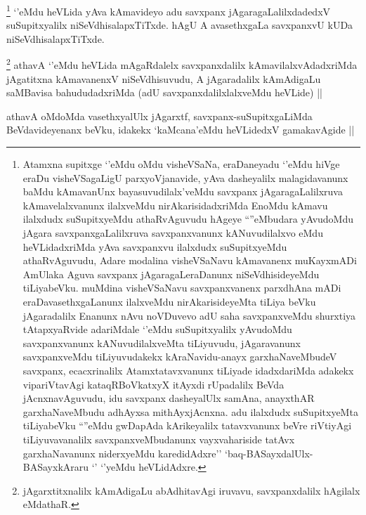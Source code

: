 \begin{artha}
\footnote{Atamxna supitxge `\stext'eMdu oMdu visheVSaNa, eraDaneyadu `\stext'eMdu hiVge eraDu visheVSagaLigU parxyoVjanavide, yAva dasheyalilx malagidavanunx baMdu kAmavanUnx bayasuvudilalx'veMdu savxpanx jAgaragaLalilxruva kAmavelalxvanunx ilalxveMdu nirAkarisidadxriMda EnoMdu kAmavu ilalxdudx suSupitxyeMdu athaRvAguvudu hAgeye ``\stext''eMbudara yAvudoMdu jAgara savxpanxgaLalilxruva savxpanxvanunx kANuvudilalxvo eMdu heVLidadxriMda yAva savxpanxvu ilalxdudx suSupitxyeMdu athaRvAguvudu, Adare modalina visheVSaNavu kAmavanenx muKayxmADi AmUlaka Aguva savxpanx jAgaragaLeraDanunx niSeVdhisideyeMdu tiLiyabeVku. muMdina visheVSaNavu savxpanxvanenx parxdhAna mADi eraDavasethxgaLanunx ilalxveMdu nirAkarisideyeMta tiLiya beVku  jAgaradalilx Enanunx nAvu noVDuvevo adU saha savxpanxveMdu shurxtiya tAtapxyaRvide adariMdale `\stext'eMdu suSupitxyalilx yAvudoMdu savxpanxvanunx kANuvudilalxveMta tiLiyuvudu, jAgaravanunx savxpanxveMdu tiLiyuvudakekx kAraNavidu-anayx garxhaNaveMbudeV savxpanx, ecacxrinalilx Atamxtatavxvanunx tiLiyade idadxdariMda adakekx vipariVtavAgi kataqRBoVkatxyX itAyxdi rUpadalilx BeVda jAcnxnavAguvudu, idu savxpanx dasheyalUlx samAna, anayxthAR garxhaNaveMbudu adhAyxsa mithAyxjAcnxna. adu ilalxdudx suSupitxyeMta tiLiyabeVku ``\stext''eMdu gwDapAda kArikeyalilx tatavxvanunx beVre riVtiyAgi tiLiyuvavanalilx savxpanxveMbudanunx vayxvahariside tatAvx garxhaNavanunx niderxyeMdu karedidAdxre'' `baq-BASayxdalUlx-BASayxkAraru `\stext' `\stext'yeMdu heVLidAdxre.}
`\stext'eMdu heVLida yAva kAmavideyo adu savxpanx jAgaragaLalilxdadedxV suSupitxyalilx niSeVdhisalapxTiTxde. hAgU A avasethxgaLa savxpanxvU kUDa niSeVdhisalapxTiTxde.
\end{artha}


\begin{artha}
\footnote{jAgarxtitxnalilx kAmAdigaLu abAdhitavAgi iruvavu, savxpanxdalilx hAgilalx eMdathaR.}
athavA `\stext'eMdu heVLida mAgaRdalelx savxpanxdalilx kAmavilalxvAdadxriMda jAgatitxna kAmavanenxV niSeVdhisuvudu, A jAgaradalilx kAmAdigaLu saMBavisa bahududadxriMda (adU savxpanxdalilxlalxveMdu heVLide) ||
\end{artha}


\begin{artha}
athavA oMdoMda vasethxyalUlx jAgarxtf, savxpanx-suSupitxgaLiMda BeVdavideyenanx beVku, idakekx `kaMcana'eMdu heVLidedxV gamakavAgide ||
\end{artha}






